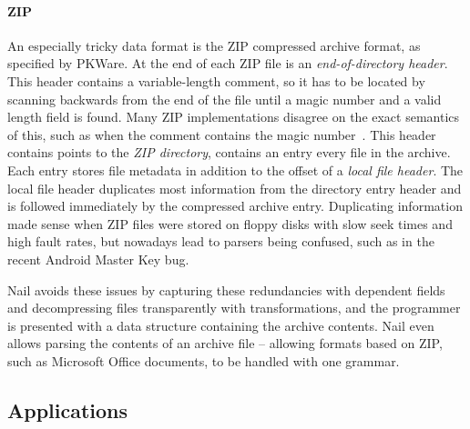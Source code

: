 \paragraph{ZIP} An especially tricky data format is the ZIP compressed archive format, as specified
by PKWare. At the end of each ZIP file is an
\emph{end-of-directory header}. This header contains a variable-length comment, so it has to be
located by scanning backwards from the end of the file until a magic number and a valid length field
is found. Many ZIP implementations disagree on the exact semantics of this, such as when the comment
contains the magic number~\cite{wolf:berlinsides-zip}.
This header  contains points to the \emph{ZIP directory}, contains an entry every file
in the archive.  Each entry stores file metadata in addition to the
offset of a \emph{local file header}. The local file header duplicates
most information from the directory entry header and is followed immediately by the compressed
archive entry.
Duplicating information made sense when ZIP files were stored on floppy
disks with slow seek times and high fault rates, but nowadays lead to parsers being confused, such
as in the recent Android Master Key bug.



Nail avoids these issues by capturing these redundancies with dependent fields and decompressing
files transparently with transformations, and the programmer
is presented with a data structure containing the archive contents. Nail even allows parsing the
contents of an archive file -- allowing formats based on ZIP, such as Microsoft Office documents, to
be handled with one grammar.



\subsection{Applications}
\label{s:eval-effort}

